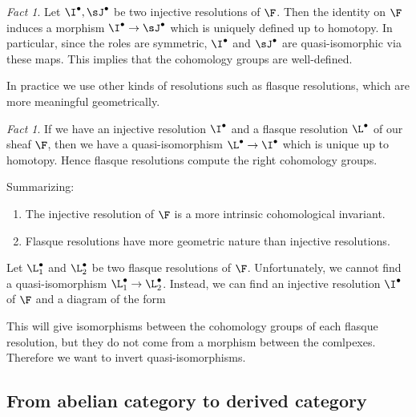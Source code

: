 \documentclass[A4paper, british]{amsart}
\theoremstyle{darkgreentheorem}
\theoremstyle{darkbluedefinition}
\theoremstyle{darkredexample}
\theoremstyle{remark}
\newtheorem{fact}[thm]{Fact}
\newcommand{\1}{\mathbbm{1}}
\newcommand{\grd}{^{\bullet}}
\begin{document}
\begin{fact}
    Let $\I\grd,\sJ\grd$ be two injective resolutions of $\F$.
    Then the identity on $\F$ induces a morphism $\I\grd\to \sJ\grd$ which is uniquely defined up to homotopy.
    In particular, since the roles are symmetric, $\I\grd$ and $\sJ\grd$ are quasi-isomorphic via these maps.
    This implies that the cohomology groups are well-defined.
\end{fact}

In practice we use other kinds of resolutions such as flasque resolutions, which are more meaningful geometrically.

\begin{fact}
    If we have an injective resolution $\I\grd$ and a flasque resolution $\L\grd$ of our sheaf $\F$, then we have a quasi-isomorphism $\L\grd\to \I\grd$ which is unique up to homotopy.
    Hence flasque resolutions compute the right cohomology groups.
\end{fact}

Summarizing:
\begin{enumerate}
    \item The injective resolution of $\F$ is a more intrinsic cohomological invariant.
    \item Flasque resolutions have more geometric nature than injective resolutions.
\end{enumerate}

Let $\L_{1}\grd$ and $\L_{2}\grd$ be two flasque resolutions of $\F$.
Unfortunately, we cannot find a quasi-isomorphism $\L_{1}\grd\to \L_{2}\grd$.
Instead, we can find an injective resolution $\I\grd$ of $\F$ and a diagram of the form
\begin{center}
\end{center}

This will give isomorphisms between the cohomology groups of each flasque resolution, but they do not come from a morphism between the comlpexes.
Therefore we want to invert quasi-isomorphisms.

\subsection{From abelian category to derived category}
\end{document}
